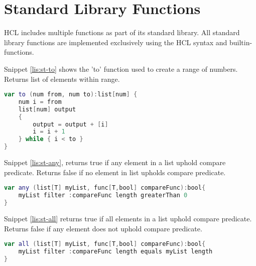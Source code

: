 \section{Standard Library Functions}
\label{standardLib}
HCL includes multiple functions as part of its standard library.
All standard library functions are implemented exclusively using the HCL syntax and builtin-functions. 

%

Snippet \ref{lis:st-to} shows the 'to' function used to create a range of numbers. Returns list of elements within range.
\begin{lstlisting}[language=Kotlin,label=lis:st-to,caption=\texttt{to} function.]
var to (num from, num to):list[num] {
	num i = from
	list[num] output
	{
		output = output + [i]
		i = i + 1
	} while { i < to }
}
\end{lstlisting}

Snippet \ref{lis:st-any}, returns true if any element in a list uphold compare predicate. Returns false if no element in list upholds compare predicate.
\begin{lstlisting}[language=Kotlin,label=lis:st-any,caption=\texttt{any} function.]
var any (list[T] myList, func[T,bool] compareFunc):bool{
	myList filter :compareFunc length greaterThan 0
}
\end{lstlisting}

Snippet \ref{lis:st-all} returns true if all elements in a list uphold compare predicate. Returns false if any element does not uphold compare predicate.
\begin{lstlisting}[language=Kotlin,label=lis:st-all,caption=\texttt{all} function.]
var all (list[T] myList, func[T,bool] compareFunc):bool{
	myList filter :compareFunc length equals myList length
}
\end{lstlisting}

